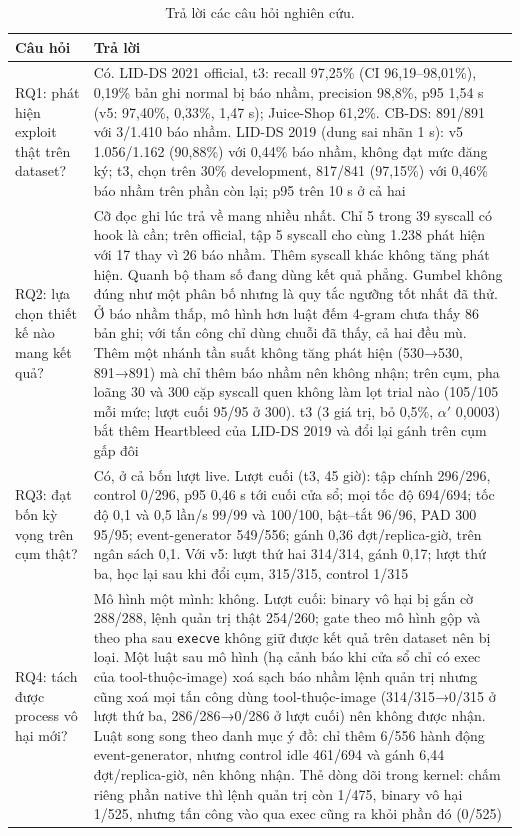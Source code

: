 \begin{longtable}[]{@{}>{\raggedright\arraybackslash}p{}>{\raggedright\arraybackslash}p{}@{}}
\caption{Trả lời các câu hỏi nghiên cứu.}\label{tab:rq-answers}\\
\toprule\noalign{}
Câu hỏi & Trả lời \\
\midrule\noalign{}
\endhead
\bottomrule\noalign{}
\endlastfoot
RQ1: phát hiện exploit thật trên dataset? & Có. LID-DS 2021 official, t3: recall 97,25\% (CI 96,19--98,01\%), 0,19\% bản ghi normal bị báo nhầm, precision 98,8\%, p95 1,54 s (v5: 97,40\%, 0,33\%, 1,47 s); Juice-Shop 61,2\%. CB-DS: 891/891 với 3/1.410 báo nhầm. LID-DS 2019 (dung sai nhãn 1 s): v5 1.056/1.162 (90,88\%) với 0,44\% báo nhầm, không đạt mức đăng ký; t3, chọn trên 30\% development, 817/841 (97,15\%) với 0,46\% báo nhầm trên phần còn lại; p95 trên 10 s ở cả hai \\
RQ2: lựa chọn thiết kế nào mang kết quả? & Cỡ đọc ghi lúc trả về mang nhiều nhất. Chỉ 5 trong 39 syscall có hook là cần; trên official, tập 5 syscall cho cùng 1.238 phát hiện với 17 thay vì 26 báo nhầm. Thêm syscall khác không tăng phát hiện. Quanh bộ tham số đang dùng kết quả phẳng. Gumbel không đúng như một phân bố nhưng là quy tắc ngưỡng tốt nhất đã thử. Ở báo nhầm thấp, mô hình hơn luật đếm 4-gram chưa thấy 86 bản ghi; với tấn công chỉ dùng chuỗi đã thấy, cả hai đều mù. Thêm một nhánh tần suất không tăng phát hiện (530→530, 891→891) mà chỉ thêm báo nhầm nên không nhận; trên cụm, pha loãng 30 và 300 cặp syscall quen không làm lọt trial nào (105/105 mỗi mức; lượt cuối 95/95 ở 300). t3 (3 giá trị, bỏ 0,5\%, $\alpha'$ 0,0003) bắt thêm Heartbleed của LID-DS 2019 và đổi lại gánh trên cụm gấp đôi \\
RQ3: đạt bốn kỳ vọng trên cụm thật? & Có, ở cả bốn lượt live. Lượt cuối (t3, 45 giờ): tập chính 296/296, control 0/296, p95 0,46 s tới cuối cửa sổ; mọi tốc độ 694/694; tốc độ 0,1 và 0,5 lần/s 99/99 và 100/100, bật--tắt 96/96, PAD 300 95/95; event-generator 549/556; gánh 0,36 đợt/replica-giờ, trên ngân sách 0,1. Với v5: lượt thứ hai 314/314, gánh 0,17; lượt thứ ba, học lại sau khi đổi cụm, 315/315, control 1/315 \\
RQ4: tách được process vô hại mới? & Mô hình một mình: không. Lượt cuối: binary vô hại bị gắn cờ 288/288, lệnh quản trị thật 254/260; gate theo mô hình gộp và theo pha sau \texttt{execve} không giữ được kết quả trên dataset nên bị loại. Một luật sau mô hình (hạ cảnh báo khi cửa sổ chỉ có exec của tool-thuộc-image) xoá sạch báo nhầm lệnh quản trị nhưng cũng xoá mọi tấn công dùng tool-thuộc-image (314/315→0/315 ở lượt thứ ba, 286/286→0/286 ở lượt cuối) nên không được nhận. Luật song song theo danh mục ý đồ: chỉ thêm 6/556 hành động event-generator, nhưng control idle 461/694 và gánh 6,44 đợt/replica-giờ, nên không nhận. Thẻ dòng dõi trong kernel: chấm riêng phần native thì lệnh quản trị còn 1/475, binary vô hại 1/525, nhưng tấn công vào qua exec cũng ra khỏi phần đó (0/525) \\

\end{longtable}
